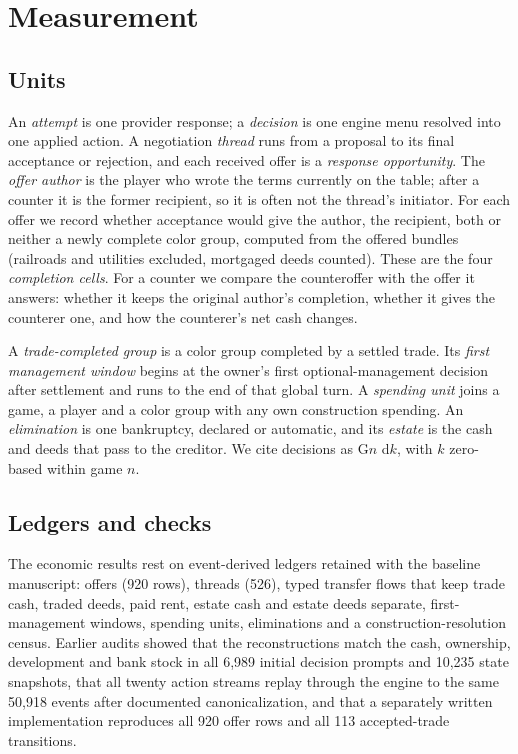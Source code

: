 \section{Measurement}
\label{sec:measurement}

\subsection{Units}

An \emph{attempt} is one provider response; a \emph{decision} is one engine menu resolved into one applied action. A negotiation \emph{thread} runs from a proposal to its final acceptance or rejection, and each received offer is a \emph{response opportunity}. The \emph{offer author} is the player who wrote the terms currently on the table; after a counter it is the former recipient, so it is often not the thread's initiator. For each offer we record whether acceptance would give the author, the recipient, both or neither a newly complete color group, computed from the offered bundles (railroads and utilities excluded, mortgaged deeds counted). These are the four \emph{completion cells}. For a counter we compare the counteroffer with the offer it answers: whether it keeps the original author's completion, whether it gives the counterer one, and how the counterer's net cash changes.

A \emph{trade-completed group} is a color group completed by a settled trade. Its \emph{first management window} begins at the owner's first optional-management decision after settlement and runs to the end of that global turn. A \emph{spending unit} joins a game, a player and a color group with any own construction spending. An \emph{elimination} is one bankruptcy, declared or automatic, and its \emph{estate} is the cash and deeds that pass to the creditor. We cite decisions as G$n$ d$k$, with $k$ zero-based within game $n$.

\subsection{Ledgers and checks}

The economic results rest on event-derived ledgers retained with the baseline manuscript: offers (920 rows), threads (526), typed transfer flows that keep trade cash, traded deeds, paid rent, estate cash and estate deeds separate, first-management windows, spending units, eliminations and a construction-resolution census. Earlier audits showed that the reconstructions match the cash, ownership, development and bank stock in all 6,989 initial decision prompts and 10,235 state snapshots, that all twenty action streams replay through the engine to the same 50,918 events after documented canonicalization, and that a separately written implementation reproduces all 920 offer rows and all 113 accepted-trade transitions.

